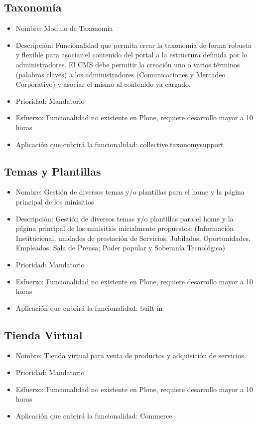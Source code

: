 \documentclass[11pt, letterpaper, oneside, spanish]{scrbook}
\begin{document}
\subsection{Taxonomía}
\label{sec-2-1-24}

\begin{itemize}
\item Nombre: Modulo de Taxonomía
\item Descripción: Funcionalidad que permita crear la taxonomía de forma robusta y
  flexible para asociar el contenido del portal a la estructura definida por
  lo administradores. El CMS debe permitir la creación uno o varios términos
  (palabras claves) a los administradores (Comunicaciones y Mercadeo
  Corporativo) y asociar el mismo al contenido ya cargado.
\item Prioridad: Mandatorio
\item Esfuerzo: Funcionalidad no existente en Plone, requiere desarrollo mayor a
  10 horas
\item Aplicación que cubrirá la funcionalidad: collective.taxonomysupport
\end{itemize}
\subsection{Temas y Plantillas}
\label{sec-2-1-25}

\begin{itemize}
\item Nombre: Gestión de diversos temas y/o plantillas para el home y la página
  principal de los minisitios
\item Descripción: Gestión de diversos temas y/o plantillas para el home y la
  página principal de los minisitios inicialmente propuestos: (Información
  Institucional, unidades de prestación de Servicios, Jubilados,
  Oportunidades, Empleados, Sala de Prensa; Poder popular y Soberanía
  Tecnológica)
\item Prioridad: Mandatorio
\item Esfuerzo: Funcionalidad no existente en Plone, requiere desarrollo mayor a 10 horas
\item Aplicación que cubrirá la funcionalidad:  built-in
\end{itemize}
\subsection{Tienda Virtual}
\label{sec-2-1-26}

\begin{itemize}
\item Nombre: Tienda virtual para venta de productos y adquisición de servicios.
\item Prioridad: Mandatorio
\item Esfuerzo: Funcionalidad no existente en Plone, requiere desarrollo mayor a
  10 horas
\item Aplicación que cubrirá la funcionalidad: Commerce
\end{itemize}
\end{document}
